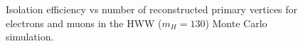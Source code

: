 \begin{figure}[!htbp]
\begin{center}
\caption{Isolation efficiency vs number of reconstructed primary vertices for electrons and muons
in the HWW ($m_{H} = 130$) Monte Carlo simulation.}
\label{fig:HWW130IsoEff_vs_NVertices}
\end{center}
\end{figure}


